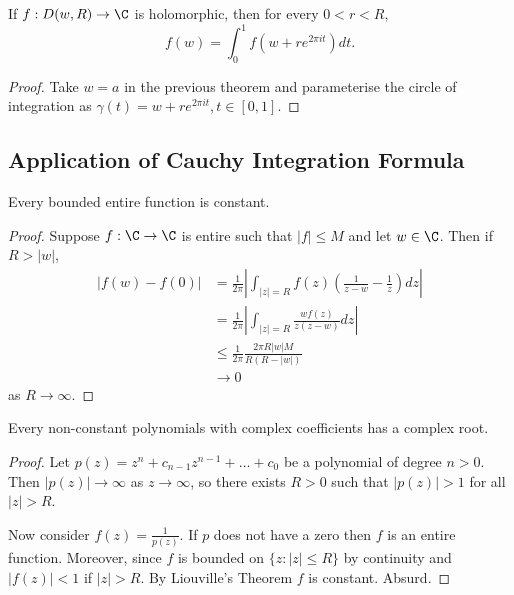 \documentclass[a4paper]{article}
\begin{document}
\begin{corollary}
  \label{cor:mean-value property}
  If \(f: D(w, R) \to \C\) is holomorphic, then for every \(0 < r < R\),
  \[
    f(w) = \int_0^1 f(w + re^{2\pi it})dt.
  \]
\end{corollary}

\begin{proof}
  Take \(w = a\) in the previous theorem and parameterise the circle of integration as \(\gamma(t) = w + re^{2\pi it}, t \in [0, 1]\).
\end{proof}

\subsection{Application of Cauchy Integration Formula}

\begin{theorem}[Liouville]
  Every bounded entire function is constant.
\end{theorem}

\begin{proof}
  Suppose \(f: \C \to \C\) is entire such that \(|f| \leq M\) and let \(w \in \C\). Then if \(R > |w|\),
  \begin{align*}
    |f(w) - f(0)|
    &=\frac{1}{2\pi}\left| \int_{|z| = R} f(z) \left( \frac{1}{z - w} - \frac{1}{z} \right) dz \right| \\
    &= \frac{1}{2\pi} \left| \int_{|z| = R} \frac{wf(z)}{z(z - w)} dz \right| \\
    &\leq \frac{1}{2\pi}\frac{2\pi R|w|M}{R(R - |w|)} \\
    &\to 0
  \end{align*}
  as \(R \to \infty\).
\end{proof}

\begin{theorem}
  Every non-constant polynomials with complex coefficients has a complex root.
\end{theorem}

\begin{proof}
  Let \(p(z) = z^n + c_{n - 1}z^{n - 1} + \dots + c_0\) be a polynomial of degree \(n > 0\). Then \(|p(z)| \to \infty\) as \(z \to \infty\), so there exists \(R > 0\) such that \(|p(z)| > 1\) for all \(|z| > R\).

  Now consider \(f(z) = \frac{1}{p(z)}\). If \(p\) does not have a zero then \(f\) is an entire function. Moreover, since \(f\) is bounded on \(\{z: |z| \leq R\}\) by continuity and \(|f(z)| < 1\) if \(|z| > R\). By Liouville's Theorem \(f\) is constant. Absurd.
\end{proof}
\end{document}
